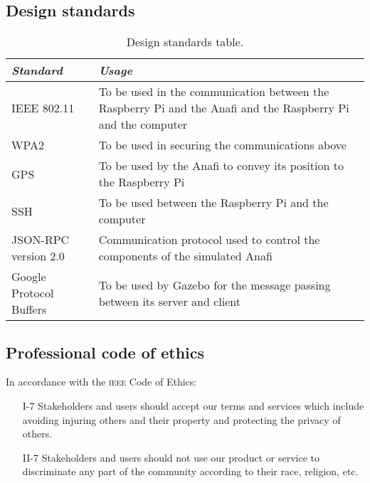 \documentclass[../main.tex]{subfiles}
\begin{document}
\subsection{Design standards}

\begin{table}[hbt!]
    \centering
    \caption{Design standards table.}
    \label{tab:design-standards}
    \begin{tabular}{ P{2.2cm} P{12.3cm} }
        \toprule
            \textit{Standard} 
                & \textit{Usage}\\

        \midrule
        IEEE 802.11 
                & To be used in the communication between 
                the Raspberry Pi and the Anafi and the 
                Raspberry Pi and the computer \\ 
                \addlinespace
        
        WPA2 
                & To be used in securing the communications above \\
                \addlinespace
        
        
        GPS 
                & To be used by the Anafi to convey its position 
                to the Raspberry Pi \\
                \addlinespace
        
        
        SSH 
                & To be used between the Raspberry Pi and the computer \\
                \addlinespace
        
        
        JSON-RPC version 2.0 
                & Communication protocol used to control the components 
                of the simulated Anafi \\
                \addlinespace
        
        
        Google Protocol Buffers 
                & To be used by Gazebo for the message passing between 
                its server and client \\
        
        \bottomrule
    \end{tabular}
\end{table}

\subsection{Professional code of ethics}

\noindent
In accordance with the \textsc{ieee} Code of Ethics:
\begin{itemize}
    \item[I-7] Stakeholders and users 
        should accept our terms and services which include 
        avoiding injuring others and their property 
        and protecting the privacy of others.
    \item[II-7] Stakeholders and users should not use our product 
        or service to discriminate any
        part of the community according 
        to their race, religion, etc.
\end{itemize}
\end{document}
